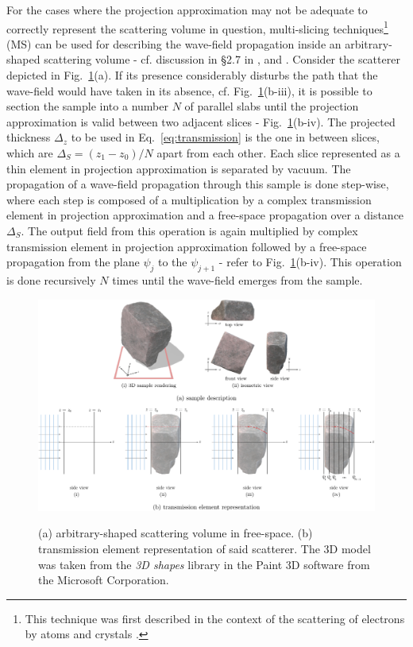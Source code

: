 \documentclass{iucr}              %
\begin{document}
For the cases where the projection approximation may not be adequate to correctly represent the scattering volume in question, multi-slicing techniques\footnote{This technique was first described in the context of the scattering of electrons by atoms and crystals \cite{Cowley1957}.} (MS) can be used for describing the wave-field propagation inside an arbitrary-shaped scattering volume - cf. discussion in \S2.7 in \cite{paganin_book}, \cite{Li2017} and \cite{Munro2019}. Consider the scatterer depicted in Fig.~\ref{fig:projection}(a). If its presence considerably disturbs the path that the wave-field would have taken in its absence, cf. Fig.~\ref{fig:projection}(b-$\mathrm{iii}$), it is possible to section the sample into a number $N$ of parallel slabs until the projection approximation is valid between two adjacent slices - Fig.~\ref{fig:projection}(b-$\mathrm{iv}$). The projected thickness $\Delta_z$ to be used in Eq.~\ref{eq:transmission} is the one in  between slices, which are $\Delta_S=(z_1 - z_0)\big/N$ apart from each other. Each slice represented as a thin element in projection approximation is separated by vacuum. The propagation of a wave-field propagation through this sample is done step-wise, where each step is composed of a multiplication by a complex transmission element in projection approximation and a free-space propagation over a distance $\Delta_S$. The output field from this operation is again multiplied by complex transmission element in projection approximation followed by a free-space propagation from the plane $\psi_j$ to the  $\psi_{j+1}$ - refer to Fig.~\ref{fig:projection}(b-$\mathrm{iv}$). This operation is done recursively $N$ times until the wave-field emerges from the sample.

\onecolumn
\begin{figure}[]
    \centering
    {\includegraphics[width=0.69\linewidth]{figures/projection_approx.pdf}}
    \caption{(a) arbitrary-shaped scattering volume in free-space. (b) transmission element representation of said scatterer. The 3D model was taken from the \textit{3D shapes} library in the Paint 3D software from the Microsoft Corporation.}
    \label{fig:projection}
\end{figure}
\twocolumn
\end{document}
